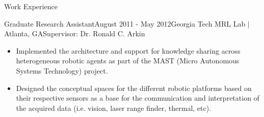 \documentclass{resume} %
\begin{document}
\begin{rSection}{Work Experience}
\begin{rSubsection}{Graduate Research Assistant}{August 2011 - May 2012}{Georgia Tech MRL Lab $\vert$ Atlanta, GA}{Supervisor: Dr. Ronald C. Arkin}
\item
\begin{itemize}

\item Implemented the architecture and support for knowledge sharing across
  heterogeneous robotic agents as part of the MAST (Micro Autonomous Systems
  Technology) project.

\item Designed the conceptual spaces for the different robotic platforms based
  on their respective sensors as a base for the communication and interpretation
  of the acquired data (i.e. vision, laser range finder, thermal, etc).

\end{itemize}

\end{rSubsection}
\fi


\end{rSection}





\end{document}
